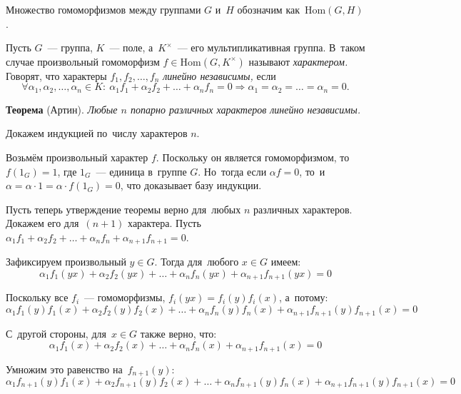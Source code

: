 \documentclass[twoside]{article}
\begin{document}
Множество гомоморфизмов между группами $G$ и~$H$ обозначим как~$\mathrm{Hom}(G, H)$.

Пусть $G$~— группа, $K$~— поле, а~$K^{\times}$~— его мультипликативная группа.
В~таком случае произвольный гомоморфизм $f \in \mathrm{Hom}(G, K^{\times})$ называют \textit{характером.}
Говорят, что характеры $f_1, f_2, \ldots, f_n$ \textit{линейно независимы,}
если
$$
    \forall \alpha_1, \alpha_2, \ldots, \alpha_n \in K{:}\ \alpha_1 f_1 + \alpha_2 f_2 + \ldots + \alpha_n f_n = 0 \Rightarrow \alpha_1 = \alpha_2 = \ldots = \alpha_n = 0.
$$

\noindent\textbf{Теорема} (Артин).\emph{
    Любые $n$ попарно различных характеров линейно независимы.
}\medskip

    Докажем индукцией по~числу характеров $n$.

    Возьмём произвольный характер $f$. Поскольку он является гомоморфизмом,
    то~$f(1_G) = 1$, где $1_G$~— единица в~группе $G$. Но~тогда если $\alpha f = 0$,
    то~и~$\alpha = \alpha \cdot 1 = \alpha \cdot f(1_G) = 0$, что доказывает базу индукции.

    Пусть теперь утверждение теоремы верно для~любых $n$ различных характеров. Докажем его для~$(n + 1)$ характера.
    Пусть $\alpha_1 f_1 + \alpha_2 f_2 + \ldots + \alpha_n f_n + \alpha_{n + 1} f_{n + 1} = 0$.

    Зафиксируем произвольный $y \in G$. Тогда для~любого $x \in G$ имеем:
    \begin{equation}\label{Artin:first}
        \alpha_1 f_1(yx) + \alpha_2 f_2(yx) + \ldots + \alpha_n f_n(yx) + \alpha_{n + 1} f_{n + 1}(yx) = 0
    \end{equation}

    Поскольку все $f_i$~— гомоморфизмы, $f_i(yx) = f_i(y) f_i(x)$, а~потому:
    $$
        \alpha_1 f_1(y) f_1(x) + \alpha_2 f_2(y) f_2(x) + \ldots + \alpha_n f_n(y) f_n(x) + \alpha_{n + 1} f_{n + 1}(y) f_{n + 1}(x) = 0
    $$

    С~другой стороны, для~$x \in G$ также верно, что:
    $$
        \alpha_1 f_1(x) + \alpha_2 f_2(x) + \ldots + \alpha_n f_n(x) + \alpha_{n + 1} f_{n + 1}(x) = 0
    $$

    Умножим это равенство на~$f_{n + 1}(y)$:
    \begin{equation}\label{Artin:second}
        \alpha_1 f_{n + 1}(y) f_1(x) + \alpha_2 f_{n + 1}(y) f_2(x) + \ldots + \alpha_n f_{n + 1}(y) f_n(x) + \alpha_{n + 1} f_{n + 1}(y) f_{n + 1}(x) = 0
    \end{equation}
\end{document}
